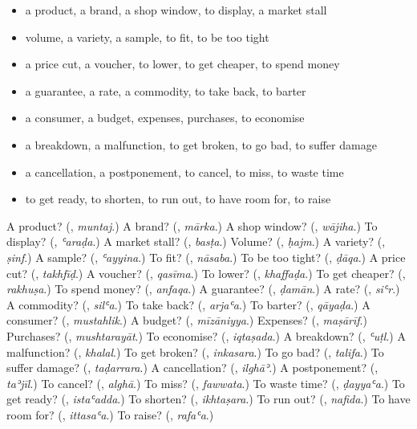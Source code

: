 \begin{itemize}
\raggedright
  \item a product, a brand, a shop window, to display, a market stall
  \item volume, a variety, a sample, to fit, to be too tight
  \item a price cut, a voucher, to lower, to get cheaper, to spend money
  \item a guarantee, a rate, a commodity, to take back, to barter
  \item a consumer, a budget, expenses, purchases, to economise
  \item a breakdown, a malfunction, to get broken, to go bad, to suffer damage
  \item a cancellation, a postponement, to cancel, to miss, to waste time
  \item to get ready, to shorten, to run out, to have room for, to raise
\end{itemize}

\begin{tcolorbox}[breakable,colback=teal!4,colframe=teal!35!black,title={Before you move on}]
A product? (\textbf{}, \emph{muntaj}.) A brand? (\textbf{}, \emph{mārka}.) A shop window? (\textbf{}, \emph{wājiha}.) To display? (\textbf{}, \emph{ʿaraḍa}.) A market stall? (\textbf{}, \emph{basṭa}.) Volume? (\textbf{}, \emph{ḥajm}.) A variety? (\textbf{}, \emph{ṣinf}.) A sample? (\textbf{}, \emph{ʿayyina}.) To fit? (\textbf{}, \emph{nāsaba}.) To be too tight? (\textbf{}, \emph{ḍāqa}.) A price cut? (\textbf{}, \emph{takhfīḍ}.) A voucher? (\textbf{}, \emph{qasīma}.) To lower? (\textbf{}, \emph{khaffaḍa}.) To get cheaper? (\textbf{}, \emph{rakhuṣa}.) To spend money? (\textbf{}, \emph{anfaqa}.) A guarantee? (\textbf{}, \emph{ḍamān}.) A rate? (\textbf{}, \emph{siʿr}.) A commodity? (\textbf{}, \emph{silʿa}.) To take back? (\textbf{}, \emph{arjaʿa}.) To barter? (\textbf{}, \emph{qāyaḍa}.) A consumer? (\textbf{}, \emph{mustahlik}.) A budget? (\textbf{}, \emph{mīzāniyya}.) Expenses? (\textbf{}, \emph{maṣārīf}.) Purchases? (\textbf{}, \emph{mushtarayāt}.) To economise? (\textbf{}, \emph{iqtaṣada}.) A breakdown? (\textbf{}, \emph{ʿuṭl}.) A malfunction? (\textbf{}, \emph{khalal}.) To get broken? (\textbf{}, \emph{inkasara}.) To go bad? (\textbf{}, \emph{talifa}.) To suffer damage? (\textbf{}, \emph{taḍarrara}.) A cancellation? (\textbf{}, \emph{ilghāʾ}.) A postponement? (\textbf{}, \emph{taʾjīl}.) To cancel? (\textbf{}, \emph{alghā}.) To miss? (\textbf{}, \emph{fawwata}.) To waste time? (\textbf{}, \emph{ḍayyaʿa}.) To get ready? (\textbf{}, \emph{istaʿadda}.) To shorten? (\textbf{}, \emph{ikhtaṣara}.) To run out? (\textbf{}, \emph{nafida}.) To have room for? (\textbf{}, \emph{ittasaʿa}.) To raise? (\textbf{}, \emph{rafaʿa}.)
\end{tcolorbox}
